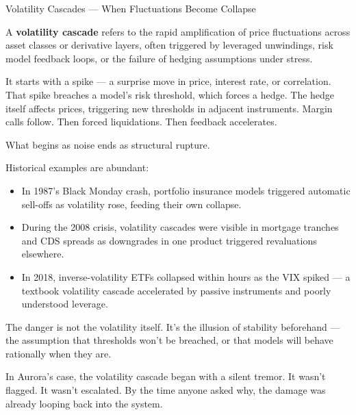\begin{TechnicalSidebar}{Volatility Cascades — When Fluctuations Become Collapse}

  A \textbf{volatility cascade} refers to the rapid amplification of price fluctuations across 
  asset classes or derivative layers, often triggered by leveraged unwindings, risk model feedback 
  loops, or the failure of hedging assumptions under stress.

  \medskip
  
  It starts with a spike — a surprise move in price, interest rate, or correlation. That spike 
  breaches a model’s risk threshold, which forces a hedge. The hedge itself affects prices, 
  triggering new thresholds in adjacent instruments. Margin calls follow. Then forced 
  liquidations. Then feedback accelerates.

  \medskip
  
  What begins as noise ends as structural rupture.

  \medskip
  
  Historical examples are abundant:

  \medskip

  \begin{itemize}
    \item In 1987’s Black Monday crash, portfolio insurance models triggered automatic sell-offs 
    as volatility rose, feeding their own collapse.
    \item During the 2008 crisis, volatility cascades were visible in mortgage tranches and CDS 
    spreads as downgrades in one product triggered revaluations elsewhere.
    \item In 2018, inverse-volatility ETFs collapsed within hours as the VIX spiked — a textbook 
    volatility cascade accelerated by passive instruments and poorly understood leverage.
  \end{itemize}

  \medskip
  
  The danger is not the volatility itself. It’s the illusion of stability beforehand — the assumption 
  that thresholds won’t be breached, or that models will behave rationally when they are.

  \medskip
  
  In Aurora’s case, the volatility cascade began with a silent tremor. It wasn’t flagged. It wasn’t 
  escalated. By the time anyone asked why, the damage was already looping back into the system.
 

\end{TechnicalSidebar}


